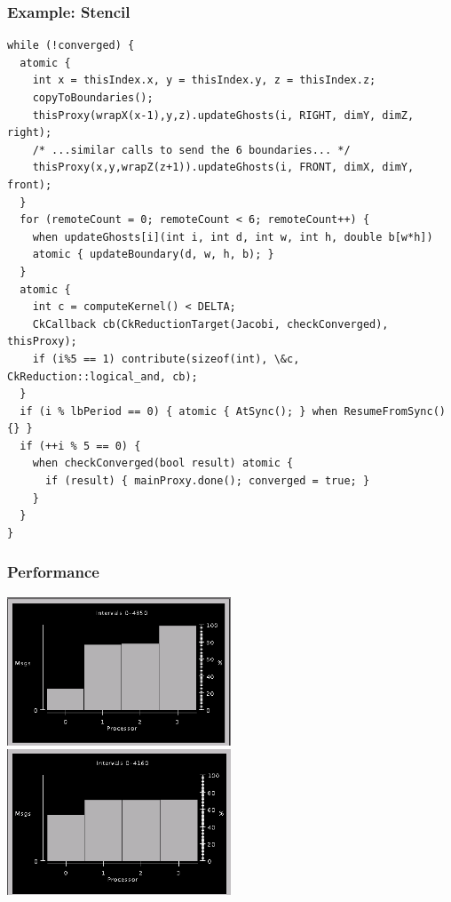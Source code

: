 \begin{frame}[fragile]
\frametitle{Example: Stencil}
\begin{lstlisting}[basicstyle=\tiny]
while (!converged) {
  atomic {
    int x = thisIndex.x, y = thisIndex.y, z = thisIndex.z;
    copyToBoundaries();
    thisProxy(wrapX(x-1),y,z).updateGhosts(i, RIGHT, dimY, dimZ, right);
    /* ...similar calls to send the 6 boundaries... */
    thisProxy(x,y,wrapZ(z+1)).updateGhosts(i, FRONT, dimX, dimY, front);
  }
  for (remoteCount = 0; remoteCount < 6; remoteCount++) {
    when updateGhosts[i](int i, int d, int w, int h, double b[w*h])
    atomic { updateBoundary(d, w, h, b); }
  }
  atomic {
    int c = computeKernel() < DELTA;
    CkCallback cb(CkReductionTarget(Jacobi, checkConverged), thisProxy);
    if (i%5 == 1) contribute(sizeof(int), \&c, CkReduction::logical_and, cb);
  }
  if (i % lbPeriod == 0) { atomic { AtSync(); } when ResumeFromSync() {} }
  if (++i % 5 == 0) {
    when checkConverged(bool result) atomic {
      if (result) { mainProxy.done(); converged = true; }
    }
  }
}
\end{lstlisting}
\end{frame}

\begin{frame}
\frametitle{Performance}
\begin{centering}
\includegraphics[width=0.5\textwidth]{figures/beforeLB}
\includegraphics[width=0.5\textwidth]{figures/afterLB}
\end{centering}
\end{frame}

